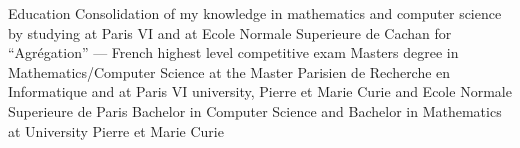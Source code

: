 \begin{rubric}{\color{ForestGreen} Education}
  Consolidation of my knowledge in mathematics and computer science by 
  studying at Paris VI and at Ecole Normale Superieure de Cachan for
  ``Agr\'egation'' --- French highest level competitive exam
  Masters degree in Mathematics/Computer Science at the Master Parisien 
  de Recherche en Informatique and at Paris VI university, Pierre et 
  Marie Curie and Ecole Normale Superieure de Paris
  Bachelor in Computer Science and Bachelor in Mathematics at University Pierre et Marie Curie
  

\end{rubric}
